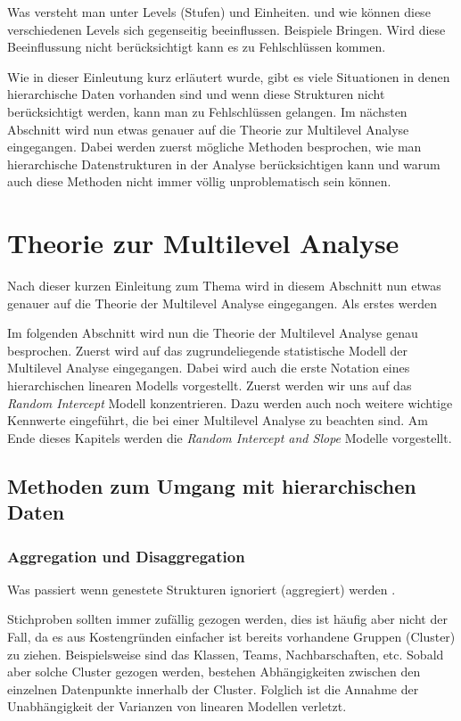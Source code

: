 \documentclass[12pt]{article}\usepackage[]{graphicx}\usepackage[]{color}
\begin{document}
Was versteht man unter Levels (Stufen) und Einheiten. und wie können diese verschiedenen Levels sich gegenseitig beeinflussen. Beispiele Bringen. 
Wird diese Beeinflussung nicht berücksichtigt kann es zu Fehlschlüssen kommen.

Wie in dieser Einleutung kurz erläutert wurde, gibt es viele Situationen in denen hierarchische Daten vorhanden sind und wenn diese Strukturen nicht berücksichtigt werden, kann man zu Fehlschlüssen gelangen. Im nächsten Abschnitt wird nun etwas genauer auf die Theorie zur Multilevel Analyse eingegangen. Dabei werden zuerst mögliche Methoden besprochen, wie man hierarchische Datenstrukturen in der Analyse berücksichtigen kann und warum auch diese Methoden nicht immer völlig unproblematisch sein können. 

\section{Theorie zur Multilevel Analyse}
Nach dieser kurzen Einleitung zum Thema wird in diesem Abschnitt nun etwas genauer auf die Theorie der Multilevel Analyse eingegangen. Als erstes werden 

Im folgenden Abschnitt wird nun die Theorie der Multilevel Analyse genau besprochen. Zuerst wird auf das zugrundeliegende statistische Modell der Multilevel Analyse eingegangen. Dabei wird auch die erste Notation eines hierarchischen linearen Modells vorgestellt. Zuerst werden wir uns auf das \textit{Random Intercept} Modell konzentrieren. Dazu werden auch noch weitere wichtige Kennwerte eingeführt, die bei einer Multilevel Analyse zu beachten sind. Am Ende dieses Kapitels werden die  \textit{Random Intercept and Slope} Modelle vorgestellt.

\subsection{Methoden zum Umgang mit hierarchischen Daten}

\subsubsection{Aggregation und Disaggregation}
Was passiert wenn genestete Strukturen ignoriert (aggregiert) werden \cite{SnijdersTomA.B2012Ma:a}.

Stichproben sollten immer zufällig gezogen werden, dies ist häufig aber nicht der Fall, da es aus Kostengründen einfacher ist bereits vorhandene Gruppen (Cluster) zu ziehen. Beispielsweise sind das Klassen, Teams, Nachbarschaften, etc. Sobald aber solche Cluster gezogen werden, bestehen Abhängigkeiten zwischen den einzelnen Datenpunkte innerhalb der Cluster. Folglich ist die Annahme der Unabhängigkeit der Varianzen von linearen Modellen verletzt.
\end{document}
